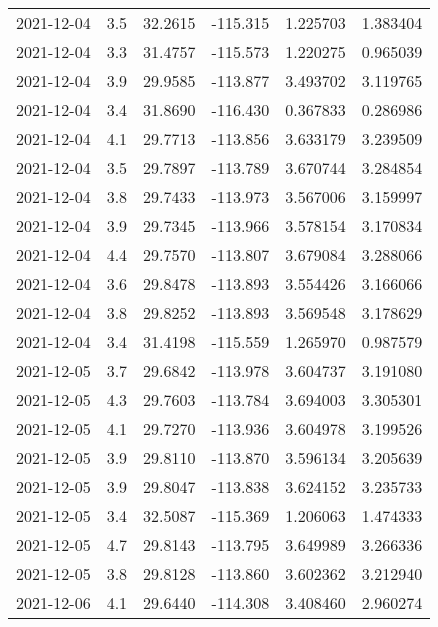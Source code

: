 \begin{tabular}{lrrrrr}
2021-12-04 &       3.5 &  32.2615 &  -115.315 &         1.225703 &         1.383404 \\
2021-12-04 &       3.3 &  31.4757 &  -115.573 &         1.220275 &         0.965039 \\
2021-12-04 &       3.9 &  29.9585 &  -113.877 &         3.493702 &         3.119765 \\
2021-12-04 &       3.4 &  31.8690 &  -116.430 &         0.367833 &         0.286986 \\
2021-12-04 &       4.1 &  29.7713 &  -113.856 &         3.633179 &         3.239509 \\
2021-12-04 &       3.5 &  29.7897 &  -113.789 &         3.670744 &         3.284854 \\
2021-12-04 &       3.8 &  29.7433 &  -113.973 &         3.567006 &         3.159997 \\
2021-12-04 &       3.9 &  29.7345 &  -113.966 &         3.578154 &         3.170834 \\
2021-12-04 &       4.4 &  29.7570 &  -113.807 &         3.679084 &         3.288066 \\
2021-12-04 &       3.6 &  29.8478 &  -113.893 &         3.554426 &         3.166066 \\
2021-12-04 &       3.8 &  29.8252 &  -113.893 &         3.569548 &         3.178629 \\
2021-12-04 &       3.4 &  31.4198 &  -115.559 &         1.265970 &         0.987579 \\
2021-12-05 &       3.7 &  29.6842 &  -113.978 &         3.604737 &         3.191080 \\
2021-12-05 &       4.3 &  29.7603 &  -113.784 &         3.694003 &         3.305301 \\
2021-12-05 &       4.1 &  29.7270 &  -113.936 &         3.604978 &         3.199526 \\
2021-12-05 &       3.9 &  29.8110 &  -113.870 &         3.596134 &         3.205639 \\
2021-12-05 &       3.9 &  29.8047 &  -113.838 &         3.624152 &         3.235733 \\
2021-12-05 &       3.4 &  32.5087 &  -115.369 &         1.206063 &         1.474333 \\
2021-12-05 &       4.7 &  29.8143 &  -113.795 &         3.649989 &         3.266336 \\
2021-12-05 &       3.8 &  29.8128 &  -113.860 &         3.602362 &         3.212940 \\
2021-12-06 &       4.1 &  29.6440 &  -114.308 &         3.408460 &         2.960274 \\

\end{tabular}
